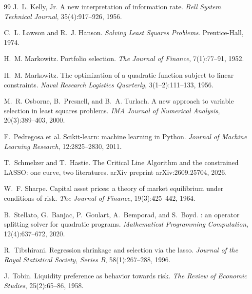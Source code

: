 \documentclass[11pt]{article}
\begin{document}
\begin{thebibliography}{99}
J.~L. Kelly, Jr.
\newblock A new interpretation of information rate.
\newblock \emph{Bell System Technical Journal}, 35(4):917--926, 1956.

C.~L. Lawson and R.~J. Hanson.
\newblock \emph{Solving Least Squares Problems}.
\newblock Prentice-Hall, 1974.

H.~M. Markowitz.
\newblock Portfolio selection.
\newblock \emph{The Journal of Finance}, 7(1):77--91, 1952.

H.~M. Markowitz.
\newblock The optimization of a quadratic function subject to linear constraints.
\newblock \emph{Naval Research Logistics Quarterly}, 3(1--2):111--133, 1956.

M.~R. Osborne, B.~Presnell, and B.~A. Turlach.
\newblock A new approach to variable selection in least squares problems.
\newblock \emph{IMA Journal of Numerical Analysis}, 20(3):389--403, 2000.

F.~Pedregosa et al.
\newblock Scikit-learn: machine learning in Python.
\newblock \emph{Journal of Machine Learning Research}, 12:2825--2830, 2011.

T.~Schmelzer and T.~Hastie.
\newblock The Critical Line Algorithm and the constrained LASSO: one curve, two
literatures.
\newblock arXiv preprint arXiv:2609.25704, 2026.

W.~F. Sharpe.
\newblock Capital asset prices: a theory of market equilibrium under conditions of risk.
\newblock \emph{The Journal of Finance}, 19(3):425--442, 1964.

B.~Stellato, G.~Banjac, P.~Goulart, A.~Bemporad, and S.~Boyd.
: an operator splitting solver for quadratic programs.
\newblock \emph{Mathematical Programming Computation}, 12(4):637--672, 2020.

R.~Tibshirani.
\newblock Regression shrinkage and selection via the lasso.
\newblock \emph{Journal of the Royal Statistical Society, Series B}, 58(1):267--288,
1996.

J.~Tobin.
\newblock Liquidity preference as behavior towards risk.
\newblock \emph{The Review of Economic Studies}, 25(2):65--86, 1958.

\end{thebibliography}
\end{document}
